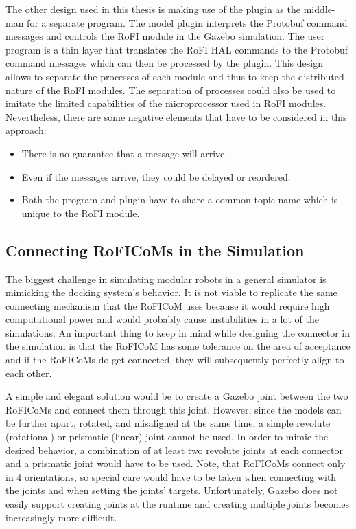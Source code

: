 \documentclass[
  printed, %
  color,   %
  notable, %
  oneside, %
  nolof,   %
  nolot,   %
  nocover,
]{fithesis3}
\begin{document}
The other design used in this thesis is making use of the plugin as the middle-man for a separate program.
The model plugin interprets the Protobuf command messages and controls the RoFI module in the Gazebo simulation.
The user program is a thin layer that translates the RoFI HAL commands to the Protobuf command messages which can then be processed by the plugin.
This design allows to separate the processes of each module and thus to keep the distributed nature of the RoFI modules.
The separation of processes could also be used to imitate the limited capabilities of the microprocessor used in RoFI modules.
Nevertheless, there are some negative elements that have to be considered in this approach:
\begin{itemize}
    \item There is no guarantee that a message will arrive.
    \item Even if the messages arrive, they could be delayed or reordered.
    \item Both the program and plugin have to share a common topic name which is unique to the RoFI module.
\end{itemize}

\subsection{Connecting RoFICoMs in the Simulation}

The biggest challenge in simulating modular robots in a general simulator is mimicking the docking system's behavior.
It is not viable to replicate the same connecting mechanism that the RoFICoM uses because it would require high computational power and would probably cause instabilities in a lot of the simulations.
An important thing to keep in mind while designing the connector in the simulation is that the RoFICoM has some tolerance on the area of acceptance\cite{roficom} and if the RoFICoMs do get connected, they will subsequently perfectly align to each other.

A simple and elegant solution would be to create a Gazebo joint between the two RoFICoMs and connect them through this joint.
However, since the models can be further apart, rotated, and misaligned at the same time, a simple revolute (rotational) or prismatic (linear) joint cannot be used.
In order to mimic the desired behavior, a combination of at least two revolute joints at each connector and a prismatic joint would have to be used.
Note, that RoFICoMs connect only in 4 orientations, so special care would have to be taken when connecting with the joints and when setting the joints' targets.
Unfortunately, Gazebo does not easily support creating joints at the runtime and creating multiple joints becomes increasingly more difficult.
\end{document}

